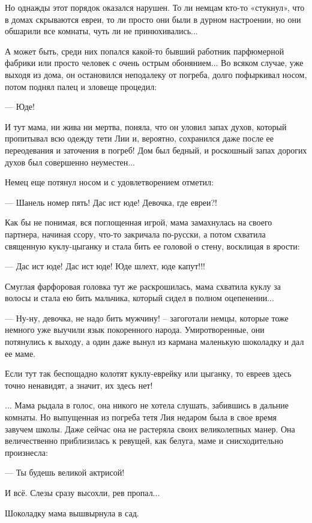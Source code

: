 Но однажды этот порядок оказался нарушен. То ли немцам кто-то «стукнул», что в
домах скрываются евреи, то ли просто они были в дурном настроении, но они
обшарили все комнаты, чуть ли не принюхивались...

А может быть, среди них попался какой-то бывший работник парфюмерной фабрики
или просто человек с очень острым обонянием... Во всяком случае, уже выходя из
дома, он остановился неподалеку от погреба, долго пофыркивал носом, потом
поднял палец и зловеще процедил:

— Юде!

И тут мама, ни жива ни мертва, поняла, что он уловил запах духов, который
пропитывал всю одежду тети Лии и, вероятно, сохранился даже после ее
переодевания и заточения в погреб! Дом был бедный, и роскошный запах дорогих
духов был совершенно неуместен...

Немец еще потянул носом и с удовлетворением отметил:

— Шанель номер пять! Дас ист юде! Девочка, где евреи?!

Как бы не понимая, вся поглощенная игрой, мама замахнулась на своего партнера,
начиная ссору, что-то закричала по-русски, а потом схватила священную
куклу-цыганку и стала бить ее головой о стену, восклицая в ярости:

— Дас ист юде! Дас ист юде! Юде шлехт, юде капут!!!

Смуглая фарфоровая головка тут же раскрошилась, мама схватила куклу за волосы и
стала ею бить мальчика, который сидел в полном оцепенении...

— Ну-ну, девочка, не надо бить мужчину! – загоготали немцы, которые тоже
немного уже выучили язык покоренного народа. Умиротворенные, они потянулись к
выходу, а один даже вынул из кармана маленькую шоколадку и дал ее маме.

Если тут так беспощадно колотят куклу-еврейку или цыганку, то евреев здесь
точно ненавидят, а значит, их здесь нет!

... Мама рыдала в голос, она никого не хотела слушать, забившись в дальние
комнаты. Но выпущенная из погреба тетя Лия недаром была в свое время завучем
школы. Даже сейчас она не растеряла своих великолепных манер. Она величественно
приблизилась к ревущей, как белуга, маме и снисходительно произнесла:

— Ты будешь великой актрисой!

И всё. Слезы сразу высохли, рев пропал...

Шоколадку мама вышвырнула в сад.

